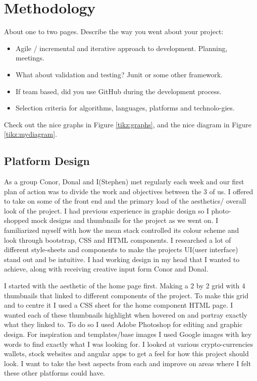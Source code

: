 \chapter{Methodology}
About one to two pages.
Describe the way you went about your project:
\begin{itemize}
\item Agile / incremental and iterative approach to development. Planning, meetings.
\item What about validation and testing? Junit or some other framework.
\item If team based, did you use GitHub during the development process.
\item Selection criteria for algorithms, languages, platforms and technolo-gies.
\end{itemize}
Check out the nice graphs in Figure \ref{tikz:graphs}, and the nice diagram in Figure \ref{tikz:mydiagram}.

\section{Platform Design}

As a group Conor, Donal and I(Stephen) met regularly each week and our first plan of action was to divide the work and objectives between the 3 of us. I offered to take on some of the front end and the primary load of the aesthetics/ overall look of the project. I had previous experience in graphic design so I photo-shopped mock designs and thumbnails for the project as we went on. I familiarized myself with how the mean stack controlled its colour scheme and look through bootstrap, CSS and HTML components. I researched a lot of different style-sheets and components to make the projects UI(user interface) stand out and be intuitive. I had working design in my head that I wanted to achieve, along with receiving creative input form Conor and Donal.

I started with the aesthetic of the home page first. Making a 2 by 2 grid with 4 thumbnails that linked to different components of the project. To make this grid and to centre it I used a CSS sheet for the home component HTML page. I wanted each of these thumbnails highlight when hovered on and portray exactly what they linked to. To do so I used Adobe Photoshop for editing and graphic design. For inspiration and templates/base images I used Google images with key words to find exactly what I was looking for. I looked at various crypto-currencies wallets, stock websites and angular apps to get a feel for how this project should look. I want to take the best aspects from each and improve on areas where I felt these other platforms could have. 

